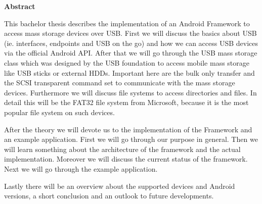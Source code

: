 

\clearemptydoublepage
{}
{}	





\vspace*{2cm}
\begin{center}
{\Large \bf Abstract}
\end{center}
\vspace{1cm}

This bachelor thesis describes the implementation of an Android Framework to access mass storage devices over USB. First we will discuss the basics about USB (ie. interfaces, endpoints and USB on the go) and how we can access USB devices via the official Android API. After that we will go through the USB mass storage class which was designed by the USB foundation to access mobile mass storage like USB sticks or external HDDs. Important here are the bulk only transfer and the SCSI transparent command set to communicate with the mass storage devices. Furthermore we will discuss file systems to access directories and files. In detail this will be the FAT32 file system from Microsoft, because it is the most popular file system on such devices.

After the theory we will devote us to the implementation of the Framework and an example application. First we will go through our purpose in general. Then we will learn something about the architecture of the framework and the actual implementation. Moreover we will discuss the current status of the framework. Next we will go through the example application.

Lastly there will be an overview about the supported devices and Android versions, a short conclusion and an outlook to future developments.